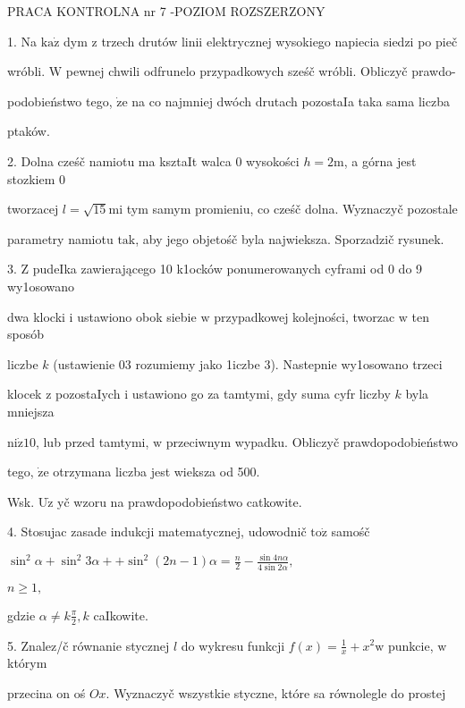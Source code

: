 \documentclass[a4paper,12pt]{article}
\begin{document}
PRACA KONTROLNA nr 7 -POZIOM ROZSZERZONY

1. Na $\mathrm{k}\mathrm{a}\dot{\mathrm{z}}$ dym $\mathrm{z}$ trzech drutów linii elektrycznej wysokiego napiecia siedzi po pieč

wróbli. $\mathrm{W}$ pewnej chwili odfrunelo przypadkowych sześč wróbli. Obliczyč prawdo-

podobieństwo tego, $\dot{\mathrm{z}}\mathrm{e}$ na co najmniej dwóch drutach pozostaIa taka sama liczba

ptaków.

2. Dolna cześč namiotu ma ksztaIt walca $0$ wysokości $h=2\mathrm{m}$, a górna jest stozkiem $0$

tworzacej $l=\sqrt{15}\mathrm{m}\mathrm{i}$ tym samym promieniu, co cześč dolna. Wyznaczyč pozostale

parametry namiotu $\mathrm{t}\mathrm{a}\mathrm{k}$, aby jego objetośč byla najwieksza. Sporzadzič rysunek.

3. $\mathrm{Z}$ pudeIka zawierającego 10 k1ocków ponumerowanych cyframi od 0 do 9 wy1osowano

dwa klocki $\mathrm{i}$ ustawiono obok siebie $\mathrm{w}$ przypadkowej kolejności, tworzac $\mathrm{w}$ ten sposób

liczbe $k$ (ustawienie 03 rozumiemy jako 1iczbe 3). Nastepnie wy1osowano trzeci

klocek $\mathrm{z}$ pozostaIych $\mathrm{i}$ ustawiono go za tamtymi, gdy suma cyfr liczby $k$ byla mniejsza

$\mathrm{n}\mathrm{i}\dot{\mathrm{z}}10$, lub przed tamtymi, $\mathrm{w}$ przeciwnym wypadku. Obliczyč prawdopodobieństwo

tego, $\dot{\mathrm{z}}\mathrm{e}$ otrzymana liczba jest wieksza od 500.

Wsk. $\mathrm{U}\dot{\mathrm{z}}$ yč wzoru na prawdopodobieństwo catkowite.

4. Stosujac zasade indukcji matematycznej, udowodnič $\mathrm{t}\mathrm{o}\dot{\mathrm{z}}$ samośč

$\sin^{2}\alpha+\sin^{2}3\alpha+ +\displaystyle \sin^{2}(2n-1)\alpha=\frac{n}{2}-\frac{\sin 4n\alpha}{4\sin 2\alpha},$

$n\geq 1,$

gdzie $\displaystyle \alpha\neq k\frac{\pi}{2}, k$ caIkowite.

5. Znalez/č równanie stycznej $l$ do wykresu funkcji $f(x)=\displaystyle \frac{1}{x}+x^{2}\mathrm{w}$ punkcie, $\mathrm{w}$ którym

przecina on oś $Ox$. Wyznaczyč wszystkie styczne, które sa równolegle do prostej
\end{document}

